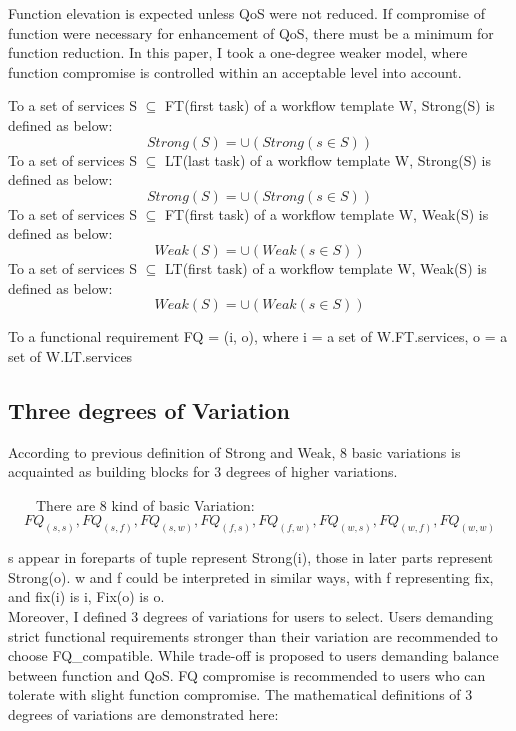 \documentclass[senior,final,11pt]{iscs-thesis}
\begin{document}
Function elevation is expected unless QoS were not reduced. If compromise of function were necessary for enhancement of QoS, there must be a minimum for function reduction. In this paper, I took a one-degree weaker model, where function compromise is controlled within an acceptable level into account. 

To a set of services S $\subseteq$ FT(first task) of a workflow template W, Strong(S) is defined as below:
\[Strong(S) = \cup(Strong(s \in S))\]
To a set of services S $\subseteq$ LT(last task) of a workflow template W, Strong(S) is defined as below:
\[Strong(S) = \cup(Strong(s \in S))\]
To a set of services S $\subseteq$ FT(first task) of a workflow template W, Weak(S) is defined as below:
\[Weak(S) = \cup(Weak(s \in S))\]
To a set of services S $\subseteq$ LT(first task) of a workflow template W, Weak(S) is defined as below:
\[Weak(S) = \cup(Weak(s \in S))\]

To a functional requirement FQ = (i, o), where i = a set of W.FT.services, o = a set of W.LT.services

\subsection{Three degrees of Variation}

According to previous definition of Strong and Weak, 8 basic variations is acquainted as building blocks for 3 degrees of higher variations. 

~~~~There are 8 kind of basic Variation: 
\[FQ_{(s,s)}, FQ_{(s,f)}, FQ_{(s,w)}, FQ_{(f,s)}, FQ_{(f,w)}, FQ_{(w,s)}, FQ_{(w,f)}, FQ_{(w,w)}\]



s appear in foreparts of tuple represent Strong(i), those in later parts represent Strong(o). w and f could be interpreted in similar ways, with f representing fix, and fix(i) is i, Fix(o) is o. \\
Moreover, I defined 3 degrees of variations for users to select. Users demanding strict functional requirements stronger than their variation are recommended to choose FQ_{compatible}. While trade-off is proposed to users demanding  balance between function and QoS. FQ compromise is recommended to users who can tolerate with slight function compromise. The mathematical definitions of 3 degrees of variations are demonstrated here: 
\end{document}
